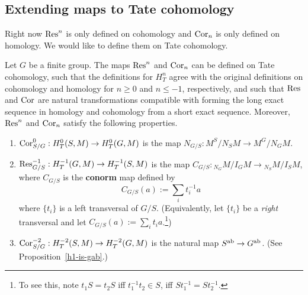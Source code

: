 \subsection{Extending maps to Tate cohomology}
Right now $\operatorname{Res}^n$ is only defined on cohomology and $\operatorname{Cor}_n$ is only defined on homology. We would like to define them on Tate cohomology.
\begin{pr}
Let $G$ be a finite group. The maps $\operatorname{Res}^n$ and $\operatorname{Cor}_n$ can be defined on Tate cohomology, such that the definitions for $H_T^n$ agree with the original definitions on cohomology and homology for $n\ge 0$ and $n\le -1$, respectively, and such that $\operatorname{Res}$ and $\operatorname{Cor}$ are natural transformations compatible with forming the long exact sequence in homology and cohomology from a short exact sequence.
Moreover, $\operatorname{Res}^n$ and $\operatorname{Cor}_n$ satisfy the following properties.
\begin{enumerate}
\item
$\operatorname{Cor}_{S/G}^{0}:H_T^0(S,M)\to H_T^0(G,M)$ is the map $N_{G/S}:M^S/N_SM\to M^G/N_GM$.
\item
$\operatorname{Res}_{G/S}^{-1}:H_T^{-1}(G,M)\to H_T^{-1}(S,M)$ is the map
$C_{G/S}:{}_{N_G}M/I_GM\to {}_{N_S}M/I_SM$, where $C_{G/S}$ is the \textbf{conorm} map defined by 
\[
C_{G/S}(a):=\sum_{i} t_i^{-1}a
\]
where $\{t_i\}$ is a left transversal of $G/S$. (Equivalently, let $\{t_i\}$ be a {\it right} transversal and let $C_{G/S}(a):=\sum_{i} t_ia$.\footnote{To see this, note $t_1S=t_2S$ iff $t_1^{-1}t_2\in S$, iff $St_1^{-1}=St_2^{-1}$.})
\item
$\operatorname{Cor}_{S/G}^{-2}:H_T^{-2}(S,M)\to H_T^{-2}(G,M)$ is the natural map $S^{\text{ab}}\to G^{\text{ab}}$. (See Proposition~\ref{h1-is-gab}.)
\end{enumerate}
\end{pr}
